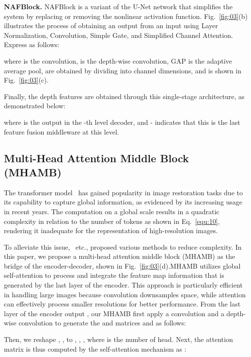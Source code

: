 \documentclass[sn-mathphys,Numbered]{sn-jnl}
\theoremstyle{thmstyleone}\newtheorem{theorem}{Theorem}\newtheorem{proposition}[theorem]{Proposition}
\theoremstyle{thmstyletwo}\newtheorem{example}{Example}\newtheorem{remark}{Remark}
\theoremstyle{thmstylethree}\newtheorem{definition}{Definition}
\begin{document}
\noindent\textbf{NAFBlock.} NAFBlock is a variant of the U-Net network that simplifies the system by replacing or removing the nonlinear activation function. Fig.~\ref{fig:03}(b) illustrates the process of obtaining an output from an input  using Layer Normalization, Convolution, Simple Gate, and Simplified Channel Attention. Express as follows:



where  is the  convolution,  is the  depth-wise convolution, GAP is the adaptive average pool,  are obtained by dividing  into channel dimensions, and  is shown in Fig.~\ref{fig:03}(c).

Finally, the depth features  are obtained through this single-stage architecture, as demonstrated below:


where  is the output in the -th level decoder, and - indicates that this is the last feature fusion middleware at this level.

\subsection{Multi-Head Attention Middle Block (MHAMB)}
The transformer model~\cite{Wang_2022_CVPR,Zamir2021Restormer,Tsai2022Stripformer} has gained popularity in image restoration tasks due to its capability to capture global information, as evidenced by its increasing usage in recent years. The computation on a global scale results in a quadratic complexity in relation to the number of tokens as shown in Eq.~\ref{equ:10}, rendering it inadequate for the representation of high-resolution images.

To alleviate this issue,~\cite{Tsai2022Stripformer,Zamir2021Restormer,liang2021swinir} etc., proposed various methods to reduce complexity. In this paper, we propose a  multi-head attention middle block (MHAMB) as the bridge of the encoder-decoder, shown in Fig.~\ref{fig:03}(d).MHAMB utilizes global self-attention to process and integrate the feature map information that is generated by the last layer of the encoder. This approach is particularly efficient in handling large images because convolution downsamples space, while attention can effectively process smaller resolutions for better performance.
From the last layer of the encoder output , our MHAMB first apply a  convolution and a  depth-wise convolution to generate the  and  matrices  and  as follows:

Then, we reshape , ,  to , , , where  is the number of head.
Next, the attention matrix is thus computed by the self-attention mechanism  as :
\end{document}
